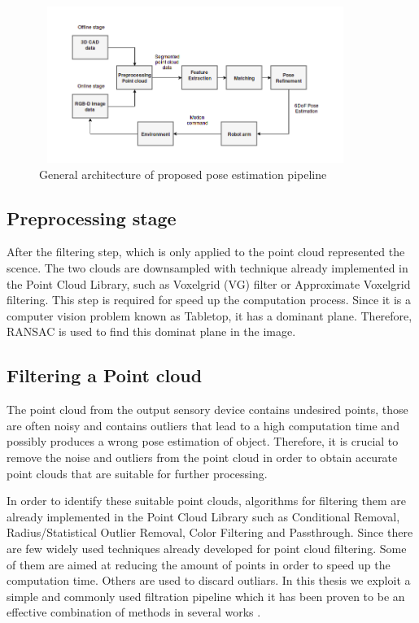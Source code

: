 \begin{figure}[!h]
\begin{center}
\includegraphics[width=4in,height=2in]{diagrams/pipelineend.png}
\caption{General architecture of proposed pose estimation pipeline}%
\label{fig:pipeline}
\end{center}
\end{figure}

\subsection{Preprocessing stage}

After the filtering step, which is only applied to the point cloud represented the scence. The two clouds are downsampled with technique already implemented in the Point Cloud Library, such as Voxelgrid (VG) filter or Approximate Voxelgrid filtering. This step is required for speed up the computation process. 
Since it is a computer vision problem known as Tabletop, it has a dominant plane. Therefore, RANSAC is used to find this dominat plane in the image. 

\subsection{Filtering a Point cloud}

The point cloud from the output sensory device contains undesired points, those are often noisy and contains outliers that lead to a high computation time and possibly produces a wrong pose estimation of object. Therefore, it is crucial to remove the noise and outliers from the point cloud in order to obtain accurate point clouds that are suitable for further processing. 

In order to identify these suitable point clouds, algorithms for filtering them are already implemented in the Point Cloud Library such as Conditional Removal, Radius/Statistical Outlier Removal, Color Filtering and Passthrough. 
Since there are few widely used techniques already developed for point cloud filtering. Some of them are aimed at reducing the amount of points in order to speed up the computation time. Others are used to discard outliars. In this thesis we exploit a simple and commonly used filtration pipeline which it has been proven to be an effective combination of methods in several works \cite{algFiltering}.

